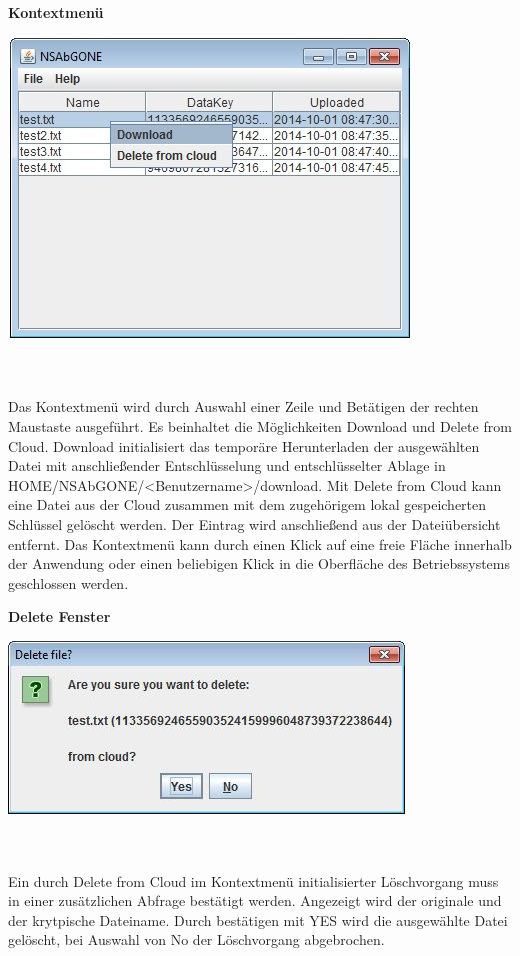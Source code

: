 \documentclass[12pt,a4paper,bibliography=totocnumbered,listof=totocnumbered]{scrartcl}
\begin{document}
\textbf{Kontextmenü}
\vspace{1em}
$\;$\\
\begin{minipage}{\linewidth}
	\centering
	\includegraphics[width=0.4\linewidth]{./img/Kontext.jpg}
	\label{Kontext}
\end{minipage}
\\\\Das Kontextmenü wird durch Auswahl einer Zeile und Betätigen der rechten Maustaste ausgeführt. Es beinhaltet die Möglichkeiten Download und Delete from Cloud. Download initialisiert das temporäre Herunterladen der ausgewählten Datei mit anschließender Entschlüsselung und entschlüsselter Ablage in HOME/NSAbGONE/\textless Benutzername\textgreater/download. Mit Delete from Cloud kann eine Datei aus der Cloud zusammen mit dem zugehörigem lokal gespeicherten Schlüssel gelöscht werden. Der Eintrag wird anschließend aus der Dateiübersicht entfernt. Das Kontextmenü kann durch einen Klick auf eine freie Fläche innerhalb der Anwendung oder einen beliebigen Klick in die Oberfläche des Betriebssystems geschlossen werden.
\pagebreak

\textbf{Delete Fenster}
\vspace{1em}
$\;$\\
\begin{minipage}{\linewidth}
	\centering
	\includegraphics[width=0.4\linewidth]{./img/Delete.jpg}
	\label{Delete}
\end{minipage}
\\\\Ein durch Delete from Cloud im Kontextmenü initialisierter Löschvorgang muss in einer zusätzlichen Abfrage bestätigt werden. Angezeigt wird der originale und der krytpische Dateiname. Durch bestätigen mit YES wird die ausgewählte Datei gelöscht, bei Auswahl von No der Löschvorgang abgebrochen.
\end{document}
